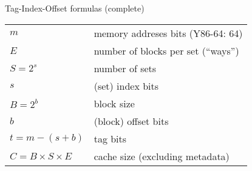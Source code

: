 \begin{frame}{Tag-Index-Offset formulas (complete)}
\def\arraystretch{1.5}
\begin{tabular}{ll}
$m$ & memory addreses bits (Y86-64: 64) \\
$E$ & number of blocks per set (``ways'') \\
$S=2^s$ & number of sets \\
$s$  & (set) index bits \\
$B=2^b$ & block size \\
$b$ & (block) offset bits \\
$t = m - (s+b)$ & tag bits \\
$C = B \times S \times E$ & cache size (excluding metadata) \\
\end{tabular}
\end{frame}
